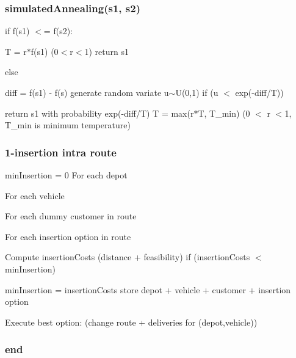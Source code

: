 \subsubsection*{simulated\+Annealing(s1, s2)}

if f(s1) $<$= f(s2)\+:
\begin{DoxyItemize}
\item T = r$\ast$f(s1) (0$<$r$<$1) return s1
\end{DoxyItemize}

else
\begin{DoxyItemize}
\item diff = f(s1) -\/ f(s) generate random variate u$\sim$U(0,1) if (u $<$ exp(-\/diff/T))
\begin{DoxyItemize}
\item return s1 with probability exp(-\/diff/T) T = max(r$\ast$\+T, T\+\_\+min) (0 $<$ r $<$1, T\+\_\+min is minimum temperature)
\end{DoxyItemize}
\end{DoxyItemize}

\subsubsection*{1-\/insertion intra route}

min\+Insertion = 0 For each depot
\begin{DoxyItemize}
\item For each vehicle
\begin{DoxyItemize}
\item For each dummy customer in route
\begin{DoxyItemize}
\item For each insertion option in route
\begin{DoxyItemize}
\item Compute insertion\+Costs (distance + feasibility) if (insertion\+Costs $<$ min\+Insertion)
\begin{DoxyItemize}
\item min\+Insertion = insertion\+Costs store depot + vehicle + customer + insertion option
\end{DoxyItemize}
\end{DoxyItemize}
\end{DoxyItemize}
\end{DoxyItemize}
\end{DoxyItemize}

Execute best option\+: (change route + deliveries for (depot,vehicle)) \subsubsection*{end}

